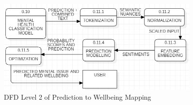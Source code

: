 \begin{figure}[h!]  
    \centering
    \includegraphics[width=0.9\textwidth]{Images/DFD L2 MW.png}  
    \caption{DFD Level 2 of Prediction to Wellbeing Mapping}
    \label{dfdl166}  %
\end{figure}

